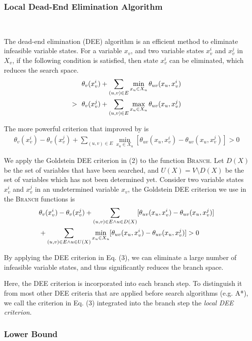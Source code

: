 \subsubsection{Local Dead-End Elimination Algorithm}\ 

\noindent The dead-end elimination (DEE) algorithm is an efficient method to eliminate infeasible variable states. For a variable $x_v$, and two variable states $x_v^i$ and $x_v^j$ in $X_v$, if the following condition is satisfied, then state $x_v^i$ can be eliminated, which reduces the search space.
\begin{align}
& \theta_v(x_v^i)+\sum_{(u,v)\in E}\min_{x_u\in X_u}\theta_{uv}(x_u,x_v^i) \notag \\
>\ \ & \theta_v(x_v^j)+\sum_{(u,v)\in E}\max_{x_u\in X_u}\theta_{uv}(x_u,x_v^j)
\end{align}

The more powerful criterion that improved by \cite{goldstein1994efficient} is
\begin{align}
\theta_v(x_v^i)-\theta_v(x_v^j)+\sum_{(u,v)\in E}\min_{x_u\in X_u}[\theta_{uv}(x_u,x_v^i)-\theta_{uv}(x_u,x_v^j)] > 0
\end{align}

We apply the Goldstein DEE criterion in (2) to the function \textsc{Branch}. Let $D(X)$ be the set of variables that have been searched, and $U(X)=V\setminus D(X)$ be the set of variables which has not been determined yet. Consider two variable states $x_v^i$ and $x_v^j$ in an undetermined variable $x_v$, the Goldstein DEE criterion we use in the \textsc{Branch} functions is
\begin{align}
& \theta_v(x_v^i)-\theta_v(x_v^j)+\sum_{(u,v)\in E\wedge u\in D(X)}[\theta_{uv}(x_u,x_v^i)-\theta_{uv}(x_u,x_v^j)] \notag \\
& +\sum_{(u,v)\in E\wedge u\in U(X)}\min_{x_u\in X_u}[\theta_{uv}(x_u,x_v^i)-\theta_{uv}(x_u,x_v^j)] > 0
\end{align}

By applying the DEE criterion in Eq. (3), we can eliminate a large number of infeasible variable states, and thus significantly reduces the branch space.

Here, the DEE criterion is incorporated into each branch step. To distinguish it from most other DEE criteria that are applied before search algorithms (e.g. A*\cite[]{gainza2013osprey}), we call the criterion in Eq. (3) integrated into the branch step the \textit{local DEE criterion}.

\subsubsection{Lower Bound}\

